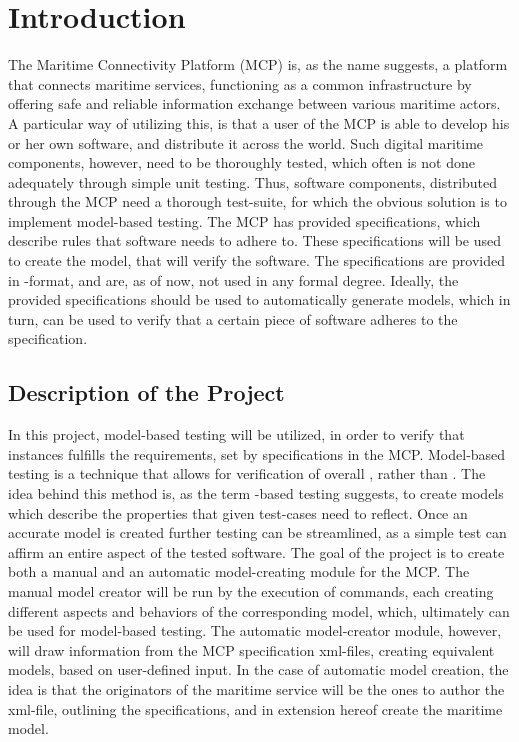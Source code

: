 \chapter{Introduction}
The Maritime Connectivity Platform \cite{mcp} (MCP) is, as the name suggests, a platform that connects maritime services, functioning as a common infrastructure by offering safe and reliable information exchange between various maritime actors. A particular way of utilizing this, is that a user of the MCP is able to develop his or her own software, and distribute it across the world. Such digital maritime components, however, need to be thoroughly tested, which often is not done adequately through simple unit testing. Thus, software components, distributed through the MCP need a thorough test-suite, for which the obvious solution is to implement model-based testing.
The MCP has provided specifications, which describe rules that software needs to adhere to. These specifications will be used to create the model, that will verify the software. The specifications are provided in -format, and are, as of now, not used in any formal degree. Ideally, the provided specifications should be used to automatically generate models, which in turn, can be used to verify that a certain piece of software adheres to the specification. 
\section{Description of the Project}
In this project, model-based testing will be utilized, in order to verify that instances fulfills the requirements, set by specifications in the MCP. Model-based testing is a technique that allows for verification of overall , rather than . The idea behind this method is, as the term -based testing suggests, to create models which describe the properties that given test-cases need to reflect. 
Once an accurate model is created further testing can be streamlined, as a simple test can affirm an entire aspect of the tested software.
The goal of the project is to create both a manual and an automatic model-creating module for the MCP. The manual model creator will be run by the execution of commands, each creating different aspects and behaviors of the corresponding model, which, ultimately can be used for model-based testing. 
The automatic model-creator module, however, will draw information from the MCP specification xml-files, creating equivalent models, based on user-defined input. In the case of automatic model creation, the idea is that the originators of the maritime service will be the ones to author the xml-file, outlining the specifications, and in extension hereof create the maritime model.
